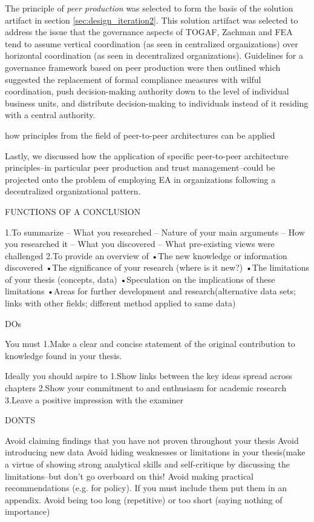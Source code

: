 The principle of \textit{peer production} was selected to form the basis of the solution artifact in section \ref{sec:design_iteration2}. This solution artifact was selected to address the issue that the governance aspects of TOGAF, Zachman and FEA tend to assume vertical coordination (as seen in centralized organizations) over horizontal coordination (as seen in decentralized organizations). Guidelines for a governance framework based on peer production were then outlined which suggested the replacement of formal compliance measures with wilful coordination, push decision-making authority down to the level of individual business units, and distribute decision-making to individuals instead of it residing with a central authority. 






how principles from the field of peer-to-peer architectures can be applied 

Lastly, we discussed how the application of specific
peer-to-peer architecture principles–in particular peer
production and trust management–could be projected onto
the problem of employing EA in organizations following a
decentralized organizational pattern.

FUNCTIONS OF A CONCLUSION

1.To summarize
 – What you researched 
 – Nature of your main arguments 
 – How you researched it 
 – What you discovered 
 – What pre-existing views were challenged
2.To provide an overview of 
•The new knowledge or information discovered
•The significance of your research (where is it new?)
•The limitations of your thesis (concepts, data)
•Speculation on the implications of these limitations
•Areas for further development and research(alternative data sets; links with other fields; different method applied to same data)


DOs

You must 
1.Make a clear and concise statement of the original contribution to knowledge found in your thesis.

Ideally you should aspire to
1.Show links between the key ideas spread across chapters
2.Show your commitment to and enthusiasm for academic research
3.Leave a positive impression with the examiner


DONTS

Avoid claiming findings that you have not proven throughout your thesis
Avoid introducing new data
Avoid hiding weaknesses or limitations in your thesis(make a virtue of showing strong analytical skills and self-critique by discussing the limitations--but don't go overboard on this!
Avoid making practical recommendations (e.g. for policy). If you must include them put them in an appendix.
Avoid being too long (repetitive) or too short (saying nothing of importance)


